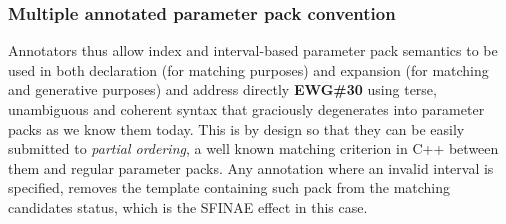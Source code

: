 \subsubsection{Multiple annotated parameter pack convention}


\p Annotators thus allow index and interval-based parameter pack semantics to be used in both declaration (for matching purposes) and expansion (for matching and generative purposes) and address directly \textbf{EWG\#30} \cite{Abrahams2012} using terse, unambiguous and coherent syntax that graciously degenerates into parameter packs as we know them today.
This is by design so that they can be easily submitted to \textit{partial ordering}, a well known matching criterion in C++ between them and regular parameter packs.
Any annotation where an invalid interval is specified, removes the template containing such pack from the matching candidates status, which is the SFINAE \cite{sfinae} effect in this case.
        
